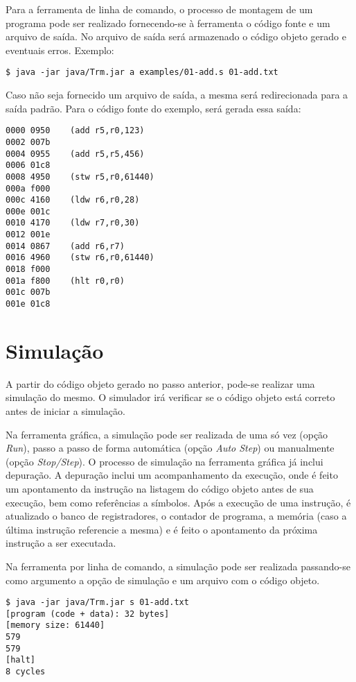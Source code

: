 \documentclass[11pt,a4paper]{report}
\begin{document}
Para a ferramenta de linha de comando, o processo de montagem de um
programa pode ser realizado fornecendo-se à ferramenta o código fonte e
um arquivo de saída. No arquivo de saída será armazenado o código objeto
gerado e eventuais erros. Exemplo:

\begin{verbatim}
$ java -jar java/Trm.jar a examples/01-add.s 01-add.txt
\end{verbatim}

Caso não seja fornecido um arquivo de saída, a mesma será redirecionada
para a saída padrão. Para o código fonte do exemplo, será gerada essa
saída:

\begin{verbatim}
0000 0950    (add r5,r0,123)
0002 007b
0004 0955    (add r5,r5,456)
0006 01c8
0008 4950    (stw r5,r0,61440)
000a f000
000c 4160    (ldw r6,r0,28)
000e 001c
0010 4170    (ldw r7,r0,30)
0012 001e
0014 0867    (add r6,r7)
0016 4960    (stw r6,r0,61440)
0018 f000
001a f800    (hlt r0,r0)
001c 007b
001e 01c8
\end{verbatim}

\section{Simulação}

A partir do código objeto gerado no passo anterior, pode-se realizar uma
simulação do mesmo. O simulador irá verificar se o código objeto está
correto antes de iniciar a simulação.

Na ferramenta gráfica, a simulação pode ser realizada de uma só vez
(opção \textit{Run}), passo a passo de forma automática (opção
\textit{Auto Step}) ou manualmente (opção \textit{Stop/Step}). O processo
de simulação na ferramenta gráfica já inclui depuração. A depuração
inclui um acompanhamento da execução, onde é feito um apontamento da
instrução na listagem do código objeto antes de sua execução, bem como
referências a símbolos. Após a execução de uma instrução, é atualizado
o banco de registradores, o contador de programa, a memória (caso a
última instrução referencie a mesma) e é feito o apontamento da próxima
instrução a ser executada.

Na ferramenta por linha de comando, a simulação pode ser realizada
passando-se como argumento a opção de simulação e um arquivo com o código
objeto.

\begin{verbatim}
$ java -jar java/Trm.jar s 01-add.txt
[program (code + data): 32 bytes]
[memory size: 61440]
579
579
[halt]
8 cycles
\end{verbatim}
\end{document}
